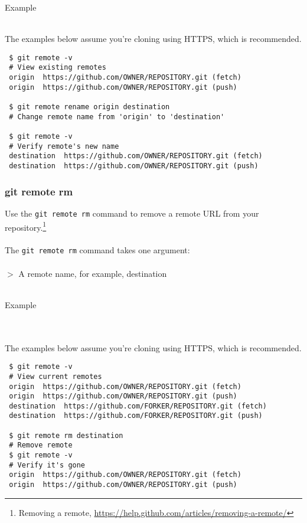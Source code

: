 \documentclass[12pt,letterpaper,dvips]{article}
\newcommand{\cmd}[1]{\texttt{#1}}
\begin{document}
\newpage
\noindent \begin{bf}Example\end{bf}\\
The examples below assume you're cloning using HTTPS, which is recommended.

\begin{Verbatim}
 $ git remote -v
 # View existing remotes
 origin  https://github.com/OWNER/REPOSITORY.git (fetch)
 origin  https://github.com/OWNER/REPOSITORY.git (push)

 $ git remote rename origin destination
 # Change remote name from 'origin' to 'destination'

 $ git remote -v
 # Verify remote's new name
 destination  https://github.com/OWNER/REPOSITORY.git (fetch)
 destination  https://github.com/OWNER/REPOSITORY.git (push)
\end{Verbatim}


\subsubsection{git remote rm}
Use the \cmd{git remote rm} command to remove a remote URL
from your repository.\footnote{Removing a remote,
\href{https://help.github.com/articles/removing-a-remote/}{https://help.github.com/articles/removing-a-remote/}}
\\
\\
The \cmd{git remote rm} command takes one argument:
\\
\\
$>$ A remote name, for example, destination
\\
\\
\noindent \begin{bf}Example\end{bf}
\\
\\
The examples below assume you're cloning using HTTPS, which is recommended.

\begin{Verbatim}
 $ git remote -v
 # View current remotes
 origin  https://github.com/OWNER/REPOSITORY.git (fetch)
 origin  https://github.com/OWNER/REPOSITORY.git (push)
 destination  https://github.com/FORKER/REPOSITORY.git (fetch)
 destination  https://github.com/FORKER/REPOSITORY.git (push)

 $ git remote rm destination
 # Remove remote
 $ git remote -v
 # Verify it's gone
 origin  https://github.com/OWNER/REPOSITORY.git (fetch)
 origin  https://github.com/OWNER/REPOSITORY.git (push)
\end{Verbatim}
\end{document}
